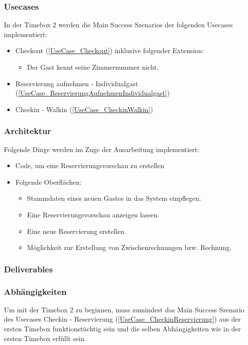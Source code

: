 \subsubsection{Usecases}
In der Timebox 2 werden die Main Success Szenarios der folgenden Usecases implementiert:

\begin{itemize}
	\item Checkout (\ref{UseCase_Checkout}) inklusive folgender Extension:
	\begin{itemize}
		\item Der \Gls{Gast} kennt seine \Gls{Zimmernummer} nicht.
	\end{itemize}
	\item Reservierung aufnehmen - Individualgast (\ref{UseCase_ReservierungAufnehmenIndividualgast})
	\item Checkin - Walkin (\ref{UseCase_CheckinWalkin})
\end{itemize}

\subsubsection{Architektur}
Folgende Dinge werden im Zuge der Ausarbeitung implementiert:

\begin{itemize}
	\item Code, um eine \Gls{Reservierung}svorschau zu erstellen
	\item Folgende Oberflächen:
	\begin{itemize}
		\item Stammdaten eines neuen \Gls{Gast}es in das System einpflegen.
		\item Eine \Gls{Reservierung}svorschau anzeigen lassen.
		\item Eine neue \Gls{Reservierung} erstellen.
		\item Möglichkeit zur Erstellung von Zwischenrechnungen bzw. \Gls{Rechnung}.
	\end{itemize}
\end{itemize}

\subsubsection{Deliverables}
\subsubsection{Abhängigkeiten}
Um mit der Timebox 2 zu beginnen, muss zumindest das Main Success Szenario des Usecases Checkin - Reservierung (\ref{UseCase_CheckinReservierung}) aus der ersten Timebox funktionstüchtig sein
und die selben Abhängigkeiten wie in der ersten Timebox erfüllt sein.


